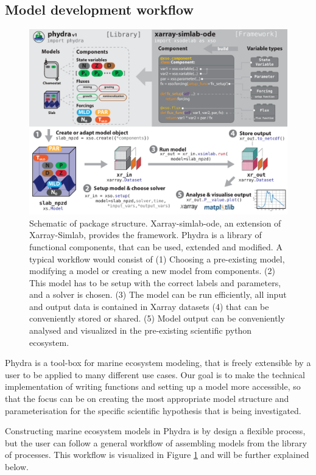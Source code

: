 \documentclass[journal abbreviation, manuscript]{copernicus}
\begin{document}
\subsection{Model development workflow}

%
\begin{figure}[t]
\includegraphics[width=12cm]{Figures/firstdraft_schematics/00_schematics_Package.pdf}
\caption{Schematic of package structure. Xarray-simlab-ode, an extension of Xarray-Simlab, provides the framework. Phydra is a library of functional components, that can be used, extended and modified. A typical workflow would consist of (1) Choosing a pre-existing model, modifying a model or creating a new model from components. (2) This model has to be setup with the correct labels and parameters, and a solver is chosen. (3) The model can be run efficiently, all input and output data is contained in Xarray datasets (4)  that can be conveniently stored or shared. (5) Model output can be conveniently analysed and visualized in the pre-existing scientific python ecosystem.}
\label{Figure:phydraschematics}
\end{figure}

Phydra is a tool-box for marine ecosystem modeling, that is freely extensible by a user to be applied to many different use cases. Our goal is to make the technical implementation of writing functions and setting up a model more accessible, so that the focus can be on creating the most appropriate model structure and parameterisation for the specific scientific hypothesis that is being investigated. 

Constructing marine ecosystem models in Phydra is by design a flexible process, but the user can follow a general workflow of assembling models from the library of processes. This workflow is visualized in Figure \ref{Figure:phydraschematics} and will be further explained below.
\end{document}

